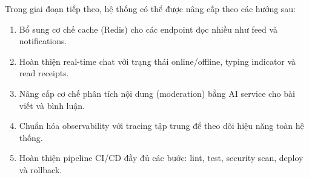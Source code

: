 \documentclass[a4paper]{article}
\begin{document}
    Trong giai đoạn tiếp theo, hệ thống có thể được nâng cấp theo các hướng sau:
    \begin{enumerate}
        \item Bổ sung cơ chế cache (Redis) cho các endpoint đọc nhiều như feed và notifications.
        \item Hoàn thiện real-time chat với trạng thái online/offline, typing indicator và read receipts.
        \item Nâng cấp cơ chế phân tích nội dung (moderation) bằng AI service cho bài viết và bình luận.
        \item Chuẩn hóa observability với tracing tập trung để theo dõi hiệu năng toàn hệ thống.
        \item Hoàn thiện pipeline CI/CD đầy đủ các bước: lint, test, security scan, deploy và rollback.
    \end{enumerate}
\end{document}
